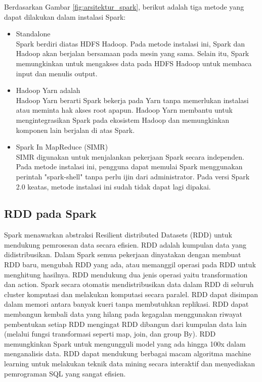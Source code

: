 Berdasarkan Gambar \ref{fig:arsitektur_spark}, berikut adalah tiga metode yang dapat dilakukan dalam  instalasi Spark:

\begin{itemize}
\item Standalone\\  
Spark berdiri diatas HDFS Hadoop. Pada metode instalasi ini, Spark dan Hadoop akan berjalan bersamaan pada mesin yang sama. Selain itu, Spark memungkinkan untuk mengakses data pada HDFS Hadoop untuk membaca input dan menulis output.

\item Hadoop Yarn adalah \\
Hadoop Yarn berarti Spark bekerja pada Yarn tanpa memerlukan instalasi atau meminta hak akses root apapun. Hadoop Yarn membantu untuk mengintegrasikan Spark pada ekosistem Hadoop dan memungkinkan komponen lain berjalan di atas Spark.

\item Spark In MapReduce (SIMR)\\ 
SIMR digunakan untuk menjalankan pekerjaan Spark secara independen. Pada metode instalasi ini, pengguna dapat memulai Spark menggunakan perintah "spark-shell" tanpa perlu ijin dari administrator. Pada versi Spark 2.0 keatas, metode instalasi ini sudah tidak dapat lagi dipakai.
\end{itemize}

\subsection{RDD pada Spark}
\par Spark menawarkan abstraksi Resilient distributed Datasets (RDD) untuk mendukung pemrosesan data secara efisien. RDD adalah kumpulan data yang didistribusikan. Dalam Spark semua pekerjaan dinyatakan dengan membuat RDD baru, mengubah RDD yang ada, atau memanggil operasi pada RDD untuk menghitung hasilnya. RDD mendukung dua jenis operasi yaitu transformation dan action. Spark secara otomatis mendistribusikan data dalam RDD di seluruh cluster komputasi dan melakukan komputasi secara paralel. RDD dapat disimpan dalam memori antara banyak kueri tanpa membutuhkan replikasi. RDD dapat membangun kembali data yang hilang pada kegagalan menggunakan riwayat pembentukan setiap RDD mengingat RDD dibangun dari kumpulan data lain (melalui fungsi transformasi seperti map, join, dan group By). RDD memungkinkan Spark untuk mengungguli model yang ada hingga 100x dalam menganalisis data. RDD dapat mendukung berbagai macam algoritma machine learning untuk melakukan teknik data mining secara interaktif dan menyediakan pemrograman SQL yang sangat efisien.

